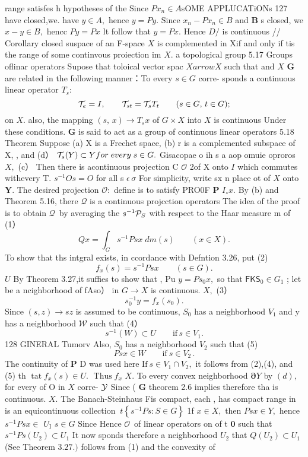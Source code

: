 range satisfes h hypotheses of the Since $P x_{n}\in A$sOME APPLUCATiONs 127 have closed,we. have $y\in A,$ hence $y=P y.$ Since $x_{n}-P x_{n}\in B$ and $\boldsymbol{B}$ s closed, we $x-y\in B,$ hencc $P y=P x$ lt follow that $y=P x.$ Hence $D\!\!\!\!/$ is continuous // Corollary closed suspace of an F-space $\textstyle{X}$ is complemented in Xif and only if tis the range of some continvous proiection im $X.$ a topological group 5.17 Groups oflinar operators Supose that toloical vector spac $\scriptstyle X{ arrow}X$ such that and $\textstyle X$ ${\boldsymbol{G}}$ are related in the following manner：To every $s\in G$ corre- sponds a continuous linear operator $T_{s}{\mathrm{:}}$ $$ {\cal T}_{e}=I,\qquad{\cal T}_{s t}={\cal T}_{s}T_{t}\qquad(s\in G,\,t\in G); $$ on $X.$ also, the mapping $(s,\,x)\to T_{s}x$ of $G\times X$ into $X$ is continuous Under these conditions. ${\boldsymbol{G}}$ is said to act as a group of continuous linear operators 5.18 Theorem Suppose (a) X is a Frechet space, (b) r is a complemented subspace of X, , and (d） ${\cal T}_{s}(Y)\subset Y f o r\;e v e r y\;s\in G.$ Gisacopae o ih s a aop omuie oproros $X,$ (c） Then there is acontinuous projection C ${\mathcal{O}}$ 2of X onto $\boldsymbol{\mathit{I}}$ which commutes withevery T. $s^{-1}O s=O$ for all s $\epsilon\,\sigma$ For simplicity, write sx n place ot of $\textstyle X$ onto ${\boldsymbol{Y}}.$ The desired projection ${\mathcal{O}}:$ define is to satisfy PRO0F $\boldsymbol{P}$ $I_{\circ}x.$ By (b) and Theorem 5.16, there ${\mathcal{Q}}$ is a continuous projcction operators The idea of the proof is to obtain ${\mathcal Q}\,$ by averaging the $s^{-1}{\cal P}_{S}$ with respect to the Haar measure m of (1） $$ Q x=\int_{G}s^{-1}P s x\;d m(s)\qquad(x\in X). $$ To show that ths intgral exists, in ccordance with Defntion 3.26, put (2) $$ f_{x}(s)=s^{-1}P s x\qquad(s\in G). $$ $U$ By Theorem 3.27,it suffies to show that , Pu $y=P s_{0}x,$ so that $\mathsf{F K S}_{0}\in G_{1}$ ; let be a ncighborhood of fAso） in $G\to X$ is continuous. $X,$ (3） $$ s_{0}^{-1}y=f_{x}(s_{0}). $$ Since $(s,z)\to s z$ is assumed to be continuous, $S_{0}$ has a neighborhood $V_{\mathrm{1}}$ and y has a neighborhood ${\mathcal{W}}$ such that (4） $$ s^{-1}(W)\subset U\qquad\mathrm{if}\,s\in V_{1}. $$128 GINERAL Tumorv Also, $S_{0}$ has a neighborhood $V_{2}$ such that (5) $$ P s x\in W\qquad{\mathrm{if~}}s\in V_{2}\,. $$ The continuity of ${\boldsymbol{P}}$ D was used here ${\mathrm{If~}}s\in V_{1}\cap V_{2}\nonumber,$ it follows from (2),(4), and (5) th $\operatorname{tat}f_{x}(s)\in U.$ $\operatorname{Thus}f_{x}$ $X.$ To every convex neighborhood $\mathbf{\partial}Y$ by $(d),$ for every of O in $X$ corre- ${\cal{Y}}$ Since ( ${\boldsymbol{G}}$ theorem 2.6 implies therefore tha is continuous. $X.$ The Banach-Steinhaus Fis compact, each , has compact range in is an equicontinuous collection $\ t\left\{s^{-1}P s\colon S\in G\right\}$ 1f $x\in X,$ then $P s x\in Y,$ hence $s^{-1}P s x\in$ $U_{\mathrm{I}}$ $s\in G$ Since Hence ${\mathcal{O}}\,$ of linear operators on of t ${\boldsymbol{0}}$ such that $s^{-1}P s(U_{2})\subset U_{1}$ It now sponds therefore a neighborhood $U_{2}$ that $Q(U_{2})\subset U_{1}$ (See Theorem $3.27.)$ follows from (1) and the convexity of 